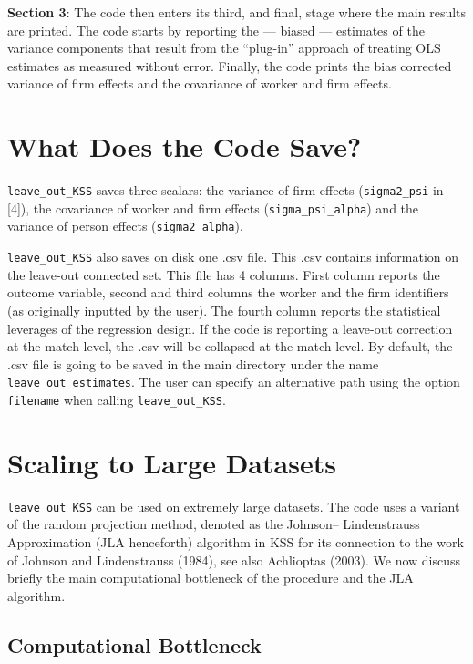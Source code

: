 \documentclass[11pt]{article}
\begin{document}
\textbf{Section 3}: The code then enters its third, and final, stage
where the main results are printed. The code starts by reporting the ---
biased --- estimates of the variance components that result from the
``plug-in'' approach of treating OLS estimates as measured without
error. Finally, the code prints the bias corrected variance of firm
effects and the covariance of worker and firm effects.

    \hypertarget{what-does-the-code-save}{%
\section{What Does the Code Save?}\label{what-does-the-code-save}}

\texttt{leave\_out\_KSS} saves three scalars: the variance of firm
effects (\texttt{sigma2\_psi} in {[}4{]}), the covariance of worker and
firm effects (\texttt{sigma\_psi\_alpha}) and the variance of person
effects (\texttt{sigma2\_alpha}).

\texttt{leave\_out\_KSS} also saves on disk one .csv file. This .csv
contains information on the leave-out connected set. This file has 4
columns. First column reports the outcome variable, second and third
columns the worker and the firm identifiers (as originally inputted by
the user). The fourth column reports the statistical leverages of the
regression design. If the code is reporting a leave-out correction at the
match-level, the .csv will be collapsed at the match level. By default,
the .csv file is going to be saved in the main directory under the name
\texttt{leave\_out\_estimates}. The user can specify an alternative path
using the option \texttt{filename} when calling
\texttt{leave\_out\_KSS}.

    \hypertarget{scaling-to-large-datasets}{%
\section{Scaling to Large Datasets}\label{scaling-to-large-datasets}}

\texttt{leave\_out\_KSS} can be used on extremely large datasets. The
code uses a variant of the random projection method, denoted as the
Johnson-- Lindenstrauss Approximation (JLA henceforth) algorithm in KSS
for its connection to the work of Johnson and Lindenstrauss (1984), see
also Achlioptas (2003). We now discuss briefly the main computational
bottleneck of the procedure and the JLA algorithm.

\hypertarget{computational-bottleneck}{%
\subsection{Computational Bottleneck}\label{computational-bottleneck}}
\end{document}
